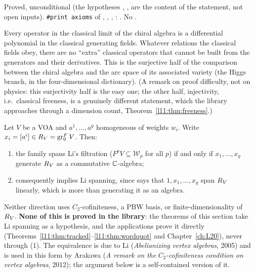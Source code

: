\begin{status}
Proved, unconditional (the hypotheses , ,  are the content of the statement, not open
inputs). \texttt{\#print axioms} of \allowbreak{}\allowbreak{}\allowbreak{},
\allowbreak{}\allowbreak{}\allowbreak{}\allowbreak{}\allowbreak{}\allowbreak{},
\allowbreak{}\allowbreak{}\allowbreak{}\allowbreak{},
\allowbreak{}\allowbreak{}\allowbreak{}\allowbreak{}:
\lean{[propext, Classical.}\allowbreak{}\allowbreak\lean{sound]}. No .
\end{status}

\begin{physics}
Every operator in the classical limit of the chiral algebra is a differential polynomial in the classical generating
fields. Whatever relations the classical fields obey, there are no ``extra'' classical operators that cannot be built from
the generators and their derivatives. This is the surjective half of the comparison between the chiral algebra and the
arc space of its associated variety (the Higgs branch, in the four-dimensional dictionary). (A remark on proof difficulty, not on
physics: this surjectivity half is the easy one; the other half, injectivity, i.e.\ classical freeness, is a genuinely
different statement, which the library approaches through a dimension count, Theorem~\ref{l11:thm:freeness}.)
\end{physics}

\begin{remark}\label{l11:rem:hdechspan}
Let $V$ be a VOA and $a^1,\dots,a^g$ homogeneous of weights $w_i$. Write $x_i = [a^i]\in R_V = \operatorname{gr}^F_0V$.
Then:
\begin{enumerate}
\item the family spans Li's filtration ($F^pV\subseteq\mathcal W_p$ for all $p$) if and only if $x_1,\dots,x_g$ generate
  $R_V$ as a commutative ${\mathbb{C}}$-algebra;
\item consequently  implies Li spanning, since  says that $1,x_1,\dots,x_g$ span $R_V$
  linearly, which is more than generating it as an algebra.
\end{enumerate}
Neither direction uses $C_2$-cofiniteness, a PBW basis, or finite-dimensionality of $R_V$. \textbf{None of this is
proved in the library}: the theorems of this section take Li spanning as a hypothesis, and the applications prove it
directly (Theorems~\ref{l11:thm:tracked}--\ref{l11:thm:wordquot} and Chapter~\ref{ch:L20}), never through (1). The
equivalence is due to Li (\emph{Abelianizing vertex algebras}, 2005) and is used in this form by Arakawa (\emph{A remark
on the $C_2$-cofiniteness condition on vertex algebras}, 2012); the argument below is a self-contained version of it.
\end{remark}

